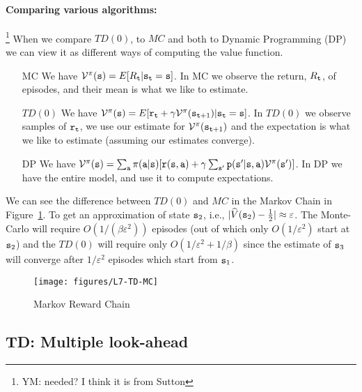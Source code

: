 \paragraph{Comparing various algorithms:}\footnote{YM: needed? I think it is from Sutton}
When we compare $TD(0)$, to $MC$ and both to  Dynamic Programming
(DP) we can view it as different ways of computing the value
function.
\begin{itemize}
\item[MC] We have $\mathcal{V}^\pi({\tt s})=E[R_{\tt t}|{\tt s}_{\tt t}={\tt s}]$. In MC we observe the
return, $R_{\tt t}$, of episodes, and their mean is what we like to
estimate.
\item [$TD(0)$]  We have $\mathcal{V}^\pi({\tt s})=E[{\tt r}_{\tt t}+\gamma \mathcal{V}^\pi({\tt s}_{{\tt t}+1})|{\tt s}_{\tt t}={\tt s}]$. In $TD(0)$ we observe samples of
${\tt r}_{\tt t}$, we use our estimate for
$\mathcal{V}^\pi({\tt s}_{{\tt t}+1})$ and the expectation is what we
like to estimate (assuming our estimates converge).
\item
[DP]
 We have $\mathcal{V}^\pi({\tt s})=\sum_{{\tt a}}\pi({\tt a}|{\tt s})[{\tt r}({\tt s},{\tt a})+\gamma \sum_{{\tt s}'}{\tt p}({\tt s}'|{\tt s},{\tt a})\mathcal{V}^\pi({\tt s}')]$. In DP we
 have the entire model, and use it to compute expectations.
\end{itemize}

We can see the difference between $TD(0)$ and $MC$ in the Markov
Chain in Figure~\ref{fig:L7-TD-MC}. To get an approximation of state
${\tt s}_2$, i.e., $|\widehat{V}({\tt s}_2)-\frac{1}{2}|\approx
\varepsilon$. The Monte-Carlo will require $O(1/(\beta
\varepsilon^2))$ episodes (out of which only $O(1/\varepsilon^2)$
start at ${\tt s}_2$) and the $TD(0)$ will require only
$O(1/\varepsilon^2+1/\beta)$ since the estimate of ${\tt s}_3$ will
converge after $1/\varepsilon^2$ episodes which start from
${\tt s}_1$.

\begin{figure}
  \begin{centering}
  \texttt{[image: figures/L7-TD-MC]}\\
  \caption{Markov Reward Chain}\label{fig:L7-TD-MC}
  \end{centering}
\end{figure}


\subsection{TD: Multiple look-ahead}

